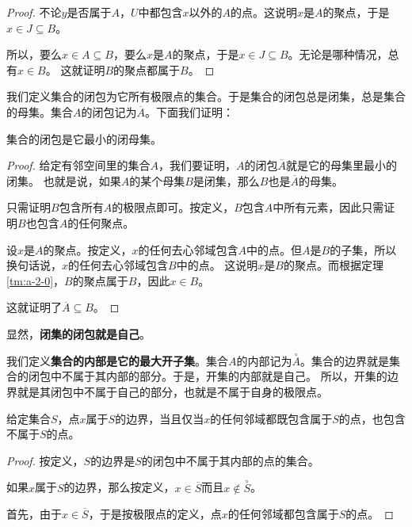 \documentclass[12pt,UTF8,fontset=none]{ctexbook}
\begin{document}
\begin{appendix}
\begin{proof}
    不论$y$是否属于$A$，$U$中都包含$x$以外的$A$的点。这说明$x$是$A$的聚点，于是$x\in J\subseteq B$。
    
    所以，要么$x\in A\subseteq B$，要么$x$是$A$的聚点，于是$x\in J\subseteq B$。无论是哪种情况，总有$x\in B$。
    这就证明$B$的聚点都属于$B$。

\end{proof}

我们定义集合的闭包为它所有极限点的集合。于是集合的闭包总是闭集，总是集合的母集。集合$A$的闭包记为$\overline{A}$。下面我们证明：

\begin{tm}\label{tm:a-2-20}
    集合的闭包是它最小的闭母集。
\end{tm}

\begin{proof}
    给定有邻空间里的集合$A$，我们要证明，$A$的闭包$\overline{A}$就是它的母集里最小的闭集。
    也就是说，如果$A$的某个母集$B$是闭集，那么$B$也是$\overline{A}$的母集。

    只需证明$B$包含所有$A$的极限点即可。按定义，$B$包含$A$中所有元素，因此只需证明$B$也包含$A$的任何聚点。

    设$x$是$A$的聚点。按定义，$x$的任何去心邻域包含$A$中的点。但$A$是$B$的子集，所以换句话说，$x$的任何去心邻域包含$B$中的点。
    这说明$x$是$B$的聚点。而根据定理\ref{tm:a-2-0}，$B$的聚点属于$B$，因此$x\in B$。
    
    这就证明了$\overline{A}\subseteq B$。

\end{proof}

显然，\textbf{闭集的闭包就是自己}。

我们定义\textbf{集合的内部是它的最大开子集}。集合$A$的内部记为$\overset{\circ}{A}$。集合的边界就是集合的闭包中不属于其内部的部分。于是，开集的内部就是自己。
所以，开集的边界就是其闭包中不属于自己的部分，也就是不属于自身的极限点。

\begin{tm}\label{tm:a-2-30}
    给定集合$S$，点$x$属于$S$的边界，当且仅当$x$的任何邻域都既包含属于$S$的点，也包含不属于$S$的点。
\end{tm}

\begin{proof}
    按定义，$S$的边界是$S$的闭包中不属于其内部的点的集合。

    如果$x$属于$S$的边界，那么按定义，$x\in \overline{S}$而且$x\notin\overset{\circ}{S}$。

    首先，由于$x\in \overline{S}$，于是按极限点的定义，点$x$的任何邻域都包含属于$S$的点。


\end{proof}
\end{appendix}
\end{document}
